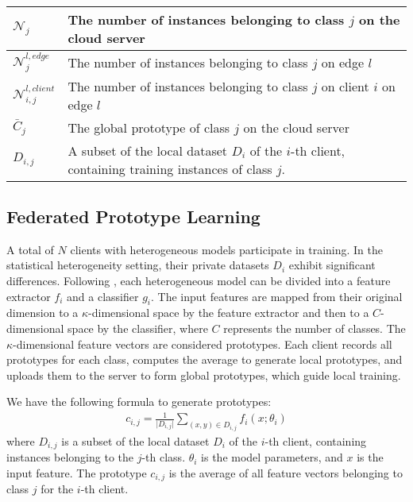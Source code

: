 \documentclass[journal]{IEEEtran}
\begin{document}
\begin{table}[H]
\begin{tabular}{|@{}m{1cm}<{\centering}|m{6.5cm}|}
    \hline
    \(\mathcal{N}_{j}\) & The number of instances belonging to class \( j \) on the cloud server \\ 
    \hline
    \(\mathcal{N}_{j}^{l,edge}\) & The number of instances belonging to class \( j \) on edge \( l \) \\ 
    \hline
    \(\mathcal{N}_{i,j}^{l,client}\) & The number of instances belonging to class \( j \) on client $i$ on edge \( l \) \\ 
    \hline
    \( \bar{C}_j \)                       & The global prototype of class $j$ on the cloud server                                                                            \\
    \hline
    \( D_{i,j} \)                         & A subset of the local dataset \(D_i\) of the $i$-th client, containing training instances of class $j$.                               \\
    \hline
  \end{tabular}
\end{table}
\subsection{Federated Prototype Learning}
A total of \( N \) clients with heterogeneous models participate in training. In the statistical heterogeneity setting, their private datasets \( D_i \) exhibit significant differences. Following \cite{tan_fedproto_2021}\cite{zhang_fedtgp_2024}, each heterogeneous model can be divided into a feature extractor \( f_i \) and a classifier \( g_i \). The input features are mapped from their original dimension to a \( \kappa \)-dimensional space by the feature extractor and then to a \( C \)-dimensional space by the classifier, where \( C \) represents the number of classes. The \( \kappa \)-dimensional feature vectors are considered prototypes. Each client records all prototypes for each class, computes the average to generate local prototypes, and uploads them to the server to form global prototypes, which guide local training.

We have the following formula to generate prototypes:
\begin{align}
\label{client prototype formula}
c_{i,j} = \frac{1}{\rvert D_{i,j} \rvert} \sum_{(x,y)\in D_{i,j}}{f_i(x;\theta_i)}
\end{align}
where $D_{i,j}$ is a subset of the local dataset $D_i$ of the $i$-th client, containing instances belonging to the $j$-th class. $\theta_i$ is the model parameters, and $x$ is the input feature. The prototype $c_{i,j}$ is the average of all feature vectors belonging to class $j$ for the $i$-th client.
\end{document}
